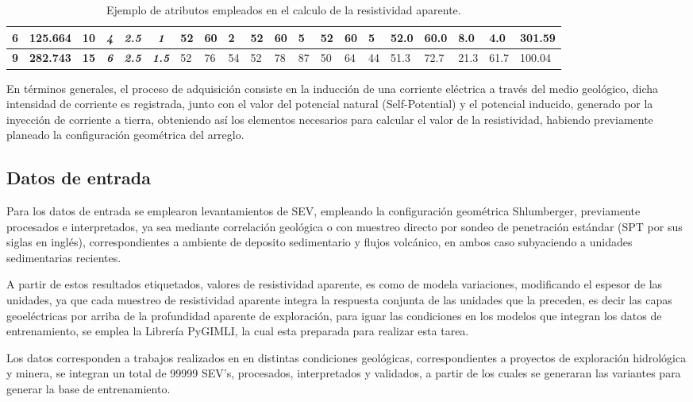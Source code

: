 \begin{table}[]
{\begin{tabular}{c|c|c|c|c|c|l|l|l|l|l|l|l|l|l|l|l|l|l|l}
			\rowcolor[HTML]{FFFFFF} 
			\textbf{6} & \textbf{125.664} & \textbf{10} & \textit{\textbf{4}} & \textit{\textbf{2.5}} & \textit{\textbf{1}} & 52 & 60 & 2 & 52 & 60 & 5 & 52 & 60 & 5 & 52.0 & 60.0 & 8.0 & 4.0 & 301.59 \\ \hline
			\rowcolor[HTML]{FFFFFF} 
			\textbf{9} & \textbf{282.743} & \textbf{15} & \textit{\textbf{6}} & \textit{\textbf{2.5}} & \textit{\textbf{1.5}} & 52 & 76 & 54 & 52 & 78 & 87 & 50 & 64 & 44 & 51.3 & 72.7 & 21.3 & 61.7 & 100.04
		\end{tabular}%
	}
	\caption{Ejemplo de atributos empleados en el calculo de la resistividad aparente.}
	\label{tab:T1}
\end{table}
	
	En términos generales, el proceso de adquisición consiste en la inducción de una corriente eléctrica a través del medio geológico, dicha intensidad de corriente es registrada, junto con el valor del potencial natural (Self-Potential) y el potencial inducido, generado por la inyección de corriente a tierra, obteniendo así los elementos necesarios para calcular el valor de la resistividad, habiendo previamente planeado la configuración geométrica del arreglo.

	\subsection{Datos de entrada}
		
		Para los datos de entrada se emplearon levantamientos de SEV, empleando la configuración geométrica Shlumberger, previamente procesados e interpretados, ya sea mediante correlación geológica o con muestreo directo por sondeo de penetración estándar (SPT por sus siglas en inglés), correspondientes a ambiente de deposito sedimentario y flujos volcánico, en ambos caso subyaciendo a unidades sedimentarias recientes.
		
		A partir de estos resultados etiquetados, valores de resistividad aparente, es como de modela variaciones, modificando el espesor de las unidades, ya que cada muestreo de resistividad aparente integra la respuesta conjunta de las unidades que la preceden, es decir las capas geoeléctricas por arriba de la profundidad aparente de exploración, para iguar las condiciones en los modelos que integran los datos de entrenamiento, se emplea la Librería PyGIMLI, la cual esta preparada para realizar esta tarea.
		
		Los datos corresponden a trabajos realizados en en distintas condiciones geológicas, correspondientes a proyectos de exploración hidrológica y minera, se integran un total de 99999 SEV's, procesados, interpretados y validados, a partir de los cuales se generaran las variantes para generar la base de entrenamiento. 
		
